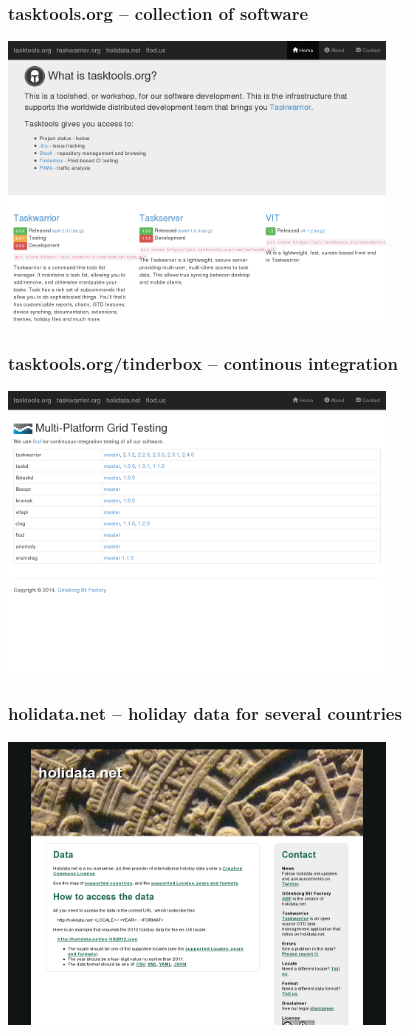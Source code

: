 \documentclass[t,handout]{beamer}
\begin{document}
\begin{frame}\frametitle{tasktools.org -- collection of software}
\begin{center}
\href{http://tasktools.org/}{\includegraphics[width=10cm,height=7.5cm]{tasktools-org.png}}
\end{center}
\end{frame}

\begin{frame}\frametitle{tasktools.org/tinderbox -- continous integration}
\begin{center}
\href{http://tasktools.org/tinderbox/}{\includegraphics[width=10cm,height=7.5cm]{tasktools-org-tinderbox.png}}
\end{center}
\end{frame}

\begin{frame}\frametitle{holidata.net -- holiday data for several countries}
\begin{center}
\href{http://holidata.net/}{\includegraphics[width=10cm,height=7.5cm]{holidata-net.png}}
\end{center}
\end{frame}
\end{document}
